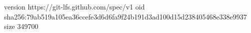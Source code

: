 version https://git-lfs.github.com/spec/v1
oid sha256:79ab519a105ea36ccefe3d6d6fa9f24b191d3ad100d15d238405468e338e9937
size 349700
